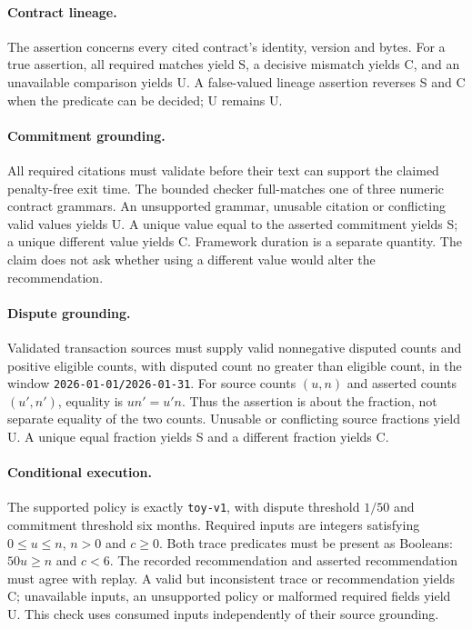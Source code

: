 \paragraph{Contract lineage.}
The assertion concerns every cited contract's identity, version and bytes. For a true assertion, all required matches yield S, a decisive mismatch yields C, and an unavailable comparison yields U. A false-valued lineage assertion reverses S and C when the predicate can be decided; U remains U.

\paragraph{Commitment grounding.}
All required citations must validate before their text can support the claimed penalty-free exit time. The bounded checker full-matches one of three numeric contract grammars. An unsupported grammar, unusable citation or conflicting valid values yields U. A unique value equal to the asserted commitment yields S; a unique different value yields C. Framework duration is a separate quantity. The claim does not ask whether using a different value would alter the recommendation.

\paragraph{Dispute grounding.}
Validated transaction sources must supply valid nonnegative disputed counts and positive eligible counts, with disputed count no greater than eligible count, in the window \texttt{2026-01-01/2026-01-31}. For source counts $(u,n)$ and asserted counts $(u',n')$, equality is $un'=u'n$. Thus the assertion is about the fraction, not separate equality of the two counts. Unusable or conflicting source fractions yield U. A unique equal fraction yields S and a different fraction yields C.

\paragraph{Conditional execution.}
The supported policy is exactly \texttt{toy-v1}, with dispute threshold $1/50$ and commitment threshold six months. Required inputs are integers satisfying $0\leq u\leq n$, $n>0$ and $c\geq0$. Both trace predicates must be present as Booleans: $50u\geq n$ and $c<6$. The recorded recommendation and asserted recommendation must agree with replay. A valid but inconsistent trace or recommendation yields C; unavailable inputs, an unsupported policy or malformed required fields yield U. This check uses consumed inputs independently of their source grounding.

